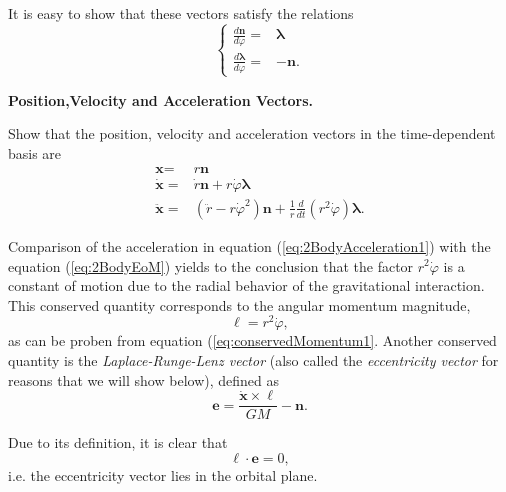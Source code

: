 It is easy to show that these vectors satisfy the relations
\begin{equation}
\begin{cases}
\frac{d \textbf{n}}{d \varphi} =& \boldsymbol{\lambda} \\
\frac{d \boldsymbol{\lambda}}{d \varphi} = & -\textbf{n}.
\end{cases}
\end{equation}

\begin{exercise}
\textbf{Position,Velocity and Acceleration Vectors.}

Show that the position, velocity and acceleration vectors in the time-dependent basis are
\begin{subequations}\label{eq:2BodyPositionVelocityAcceleration}
\begin{align}
\textbf{x} =& r \textbf{n} \\
\dot{ \textbf{x}} =& \dot{r} \textbf{n} + r \dot{\varphi} \boldsymbol{\lambda} \label{eq:2BodyVelocity1} \\
\ddot{ \textbf{x}} =& \left( \ddot{r} - r \dot{\varphi} ^2 \right) \textbf{n} + \frac{1}{r} \frac{d}{dt} \left( r^2 \dot{\varphi} \right) \boldsymbol{\lambda}. \label{eq:2BodyAcceleration1}
\end{align}
\end{subequations}
\end{exercise}
Comparison of the acceleration in equation (\ref{eq:2BodyAcceleration1}) with the equation (\ref{eq:2BodyEoM}) yields to the conclusion that the factor $r^2 \dot{\varphi}$ is a constant of motion due to the radial behavior of the gravitational interaction. This conserved quantity corresponds to the angular momentum magnitude,
\begin{equation}
\ell = r^2 \dot{\varphi}, \label{eq:2BodyAngularMomentum}
\end{equation}
as can be proben from equation (\ref{eq:conservedMomentum1}. Another conserved quantity is the \textit{Laplace-Runge-Lenz vector} (also called the \textit{eccentricity vector} for reasons that we will show below), defined as 
\begin{equation}
\textbf{e} = \frac{\dot{\textbf{x}} \times \boldsymbol{\ell}}{GM} - \textbf{n}. \label{eq:2BodyLaplaceVector}
\end{equation}

Due to its definition, it is clear that 
\begin{equation}
\boldsymbol{\ell} \cdot \textbf{e} = 0,
\end{equation}
i.e. the eccentricity vector lies in the orbital plane. 

